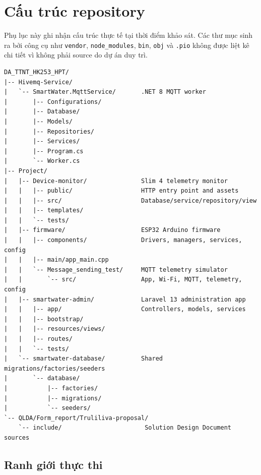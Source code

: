 \chapter{Cấu trúc repository}
\label{app:repository-structure}

Phụ lục này ghi nhận cấu trúc thực tế tại thời điểm khảo sát. Các thư mục sinh ra bởi công cụ như \texttt{vendor}, \texttt{node\_modules}, \texttt{bin}, \texttt{obj} và \texttt{.pio} không được liệt kê chi tiết vì không phải source do dự án duy trì.

\begin{verbatim}
DA_TTNT_HK253_HPT/
|-- Hivemq-Service/
|   `-- SmartWater.MqttService/       .NET 8 MQTT worker
|       |-- Configurations/
|       |-- Database/
|       |-- Models/
|       |-- Repositories/
|       |-- Services/
|       |-- Program.cs
|       `-- Worker.cs
|-- Project/
|   |-- Device-monitor/               Slim 4 telemetry monitor
|   |   |-- public/                   HTTP entry point and assets
|   |   |-- src/                      Database/service/repository/view
|   |   |-- templates/
|   |   `-- tests/
|   |-- firmware/                     ESP32 Arduino firmware
|   |   |-- components/               Drivers, managers, services, config
|   |   |-- main/app_main.cpp
|   |   `-- Message_sending_test/     MQTT telemetry simulator
|   |       `-- src/                  App, Wi-Fi, MQTT, telemetry, config
|   |-- smartwater-admin/             Laravel 13 administration app
|   |   |-- app/                      Controllers, models, services
|   |   |-- bootstrap/
|   |   |-- resources/views/
|   |   |-- routes/
|   |   `-- tests/
|   `-- smartwater-database/          Shared migrations/factories/seeders
|       `-- database/
|           |-- factories/
|           |-- migrations/
|           `-- seeders/
`-- QLDA/Form_report/Truliliva-proposal/
    `-- include/                       Solution Design Document sources
\end{verbatim}

\section{Ranh giới thực thi}

